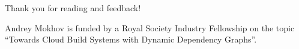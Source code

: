\documentclass[acmsmall]{acmart}\settopmatter{}
\begin{document}









\begin{acks}
  Thank you for reading and feedback!

  Andrey Mokhov is funded by a Royal Society Industry Fellowship on the topic
  ``Towards Cloud Build Systems with Dynamic Dependency Graphs''.
\end{acks}



% 
\end{document}

